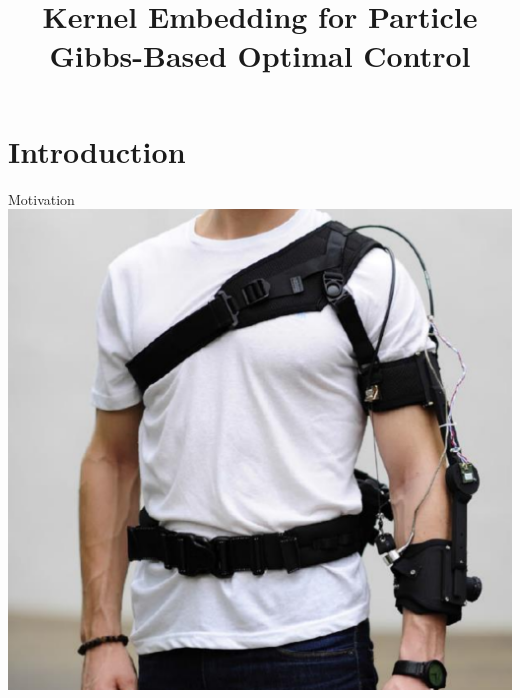 \documentclass[student, noshadow, itr, english, aspectratio=169]{ITR_LSR_slides}
\title{Kernel Embedding for Particle Gibbs-Based Optimal Control}
\begin{document}
\begin{frame}
    \titlepage
\end{frame}


\section{Introduction}
\begin{frame}{Motivation}	
\includegraphics[width= .5\textwidth]{Motivation_pic}
\cite[4]{Xiloyannis_19}
\end{frame}
\end{document}

